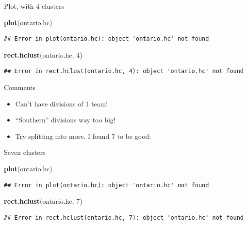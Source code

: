 \documentclass[ignorenonframetext,]{beamer}
\newenvironment{Shaded}{\begin{snugshade}}{\end{snugshade}}
\newcommand{\DecValTok}[1]{\textcolor[rgb]{0.00,0.00,0.81}{#1}}
\newcommand{\KeywordTok}[1]{\textcolor[rgb]{0.13,0.29,0.53}{\textbf{#1}}}
\newcommand{\NormalTok}[1]{#1}
\begin{document}
\begin{frame}[fragile]{Plot, with 4 clusters}
\protect\hypertarget{plot-with-4-clusters}{}

\begin{Shaded}
\begin{Highlighting}[]
\KeywordTok{plot}\NormalTok{(ontario.hc)}
\end{Highlighting}
\end{Shaded}

\begin{verbatim}
## Error in plot(ontario.hc): object 'ontario.hc' not found
\end{verbatim}

\begin{Shaded}
\begin{Highlighting}[]
\KeywordTok{rect.hclust}\NormalTok{(ontario.hc, }\DecValTok{4}\NormalTok{)}
\end{Highlighting}
\end{Shaded}

\begin{verbatim}
## Error in rect.hclust(ontario.hc, 4): object 'ontario.hc' not found
\end{verbatim}

\end{frame}

\begin{frame}{Comments}
\protect\hypertarget{comments-21}{}

\begin{itemize}
\item
  Can't have divisions of 1 team!
\item
  ``Southern'' divisions way too big!
\item
  Try splitting into more. I found 7 to be good:
\end{itemize}

\end{frame}

\begin{frame}[fragile]{Seven clusters}
\protect\hypertarget{seven-clusters}{}

\begin{Shaded}
\begin{Highlighting}[]
\KeywordTok{plot}\NormalTok{(ontario.hc)}
\end{Highlighting}
\end{Shaded}

\begin{verbatim}
## Error in plot(ontario.hc): object 'ontario.hc' not found
\end{verbatim}

\begin{Shaded}
\begin{Highlighting}[]
\KeywordTok{rect.hclust}\NormalTok{(ontario.hc, }\DecValTok{7}\NormalTok{)}
\end{Highlighting}
\end{Shaded}

\begin{verbatim}
## Error in rect.hclust(ontario.hc, 7): object 'ontario.hc' not found
\end{verbatim}

\end{frame}
\end{document}
